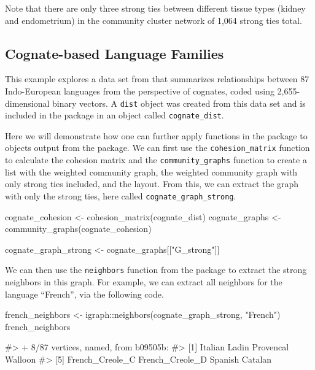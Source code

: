 Note that there are only three strong ties between different tissue
types (kidney and endometrium) in the community cluster network of 1,064
strong ties total.

\hypertarget{cognate-based-language-families}{%
\subsection{Cognate-based Language
Families}\label{cognate-based-language-families}}

This example explores a data set from \citet{dyen92} that summarizes
relationships between 87 Indo-European languages from the perspective of
cognates, coded using 2,655-dimensional binary vectors. A \texttt{dist}
object was created from this data set and is included in the
 package in an object called \texttt{cognate\_dist}.

Here we will demonstrate how one can further apply functions in the
 package to objects output from the 
package. We can first use the \texttt{cohesion\_matrix} function to
calculate the cohesion matrix and the \texttt{community\_graphs}
function to create a list with the weighted community graph, the
weighted community graph with only strong ties included, and the layout.
From this, we can extract the graph with only the strong ties, here
called \texttt{cognate\_graph\_strong}.

\begin{Schunk}
\begin{Sinput}
cognate_cohesion <- cohesion_matrix(cognate_dist)
cognate_graphs <- community_graphs(cognate_cohesion)

cognate_graph_strong <- cognate_graphs[["G_strong"]]
\end{Sinput}
\end{Schunk}

We can then use the \texttt{neighbors} function from the
 package to extract the strong neighbors in this graph.
For example, we can extract all neighbors for the language ``French'',
via the following code.

\begin{Schunk}
\begin{Sinput}
french_neighbors <- igraph::neighbors(cognate_graph_strong, "French")
french_neighbors
\end{Sinput}
\begin{Soutput}
#> + 8/87 vertices, named, from b09505b:
#> [1] Italian         Ladin           Provencal       Walloon
#> [5] French_Creole_C French_Creole_D Spanish         Catalan
\end{Soutput}
\end{Schunk}


